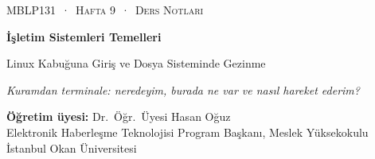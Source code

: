 \documentclass[11pt,a4paper]{article}
\begin{document}
\newcommand{\outl}[3]{\Needspace{5\baselineskip}}
\newcommand{\tl}{\textasciitilde}
\sloppy

\thispagestyle{empty}
\begin{tcolorbox}[enhanced,colback=dark,colframe=dark,arc=0pt,boxrule=0pt,
  left=18pt,right=18pt,top=20pt,bottom=20pt,coltext=white]
{\small\color{mint}\textsc{MBLP131 \,·\, Hafta 9 \,·\, Ders Notları}}\par\medskip
{\headfont\fontsize{26}{30}\selectfont\bfseries İşletim Sistemleri Temelleri}\par\medskip
{\large Linux Kabuğuna Giriş ve Dosya Sisteminde Gezinme}\par\smallskip
{\small\itshape\color{white!70} Kuramdan terminale: neredeyim, burada ne var ve nasıl hareket ederim?}
\end{tcolorbox}

\vspace{0.4em}
\begin{minipage}[t]{0.70\linewidth}
\small
\textbf{Öğretim üyesi:} Dr.\ Öğr.\ Üyesi Hasan Oğuz\\
Elektronik Haberleşme Teknolojisi Program Başkanı, Meslek Yüksekokulu\\
İstanbul Okan Üniversitesi
\end{minipage}
\end{document}
